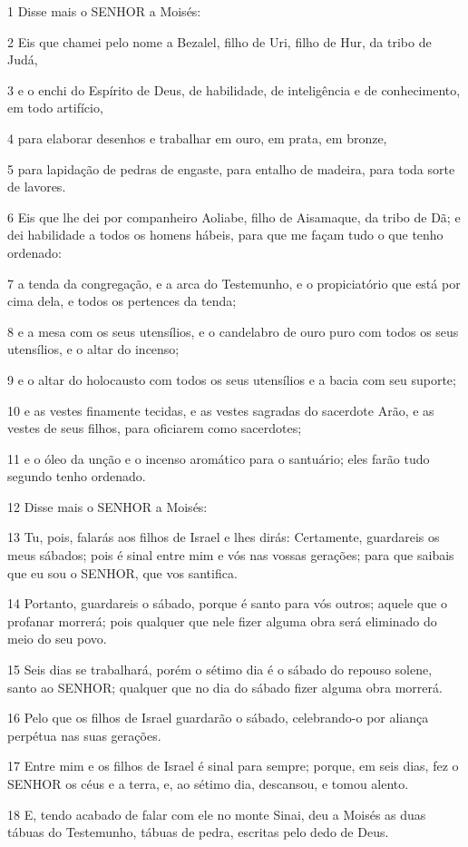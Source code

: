 \par 1 Disse mais o SENHOR a Moisés:
\par 2 Eis que chamei pelo nome a Bezalel, filho de Uri, filho de Hur, da tribo de Judá,
\par 3 e o enchi do Espírito de Deus, de habilidade, de inteligência e de conhecimento, em todo artifício,
\par 4 para elaborar desenhos e trabalhar em ouro, em prata, em bronze,
\par 5 para lapidação de pedras de engaste, para entalho de madeira, para toda sorte de lavores.
\par 6 Eis que lhe dei por companheiro Aoliabe, filho de Aisamaque, da tribo de Dã; e dei habilidade a todos os homens hábeis, para que me façam tudo o que tenho ordenado:
\par 7 a tenda da congregação, e a arca do Testemunho, e o propiciatório que está por cima dela, e todos os pertences da tenda;
\par 8 e a mesa com os seus utensílios, e o candelabro de ouro puro com todos os seus utensílios, e o altar do incenso;
\par 9 e o altar do holocausto com todos os seus utensílios e a bacia com seu suporte;
\par 10 e as vestes finamente tecidas, e as vestes sagradas do sacerdote Arão, e as vestes de seus filhos, para oficiarem como sacerdotes;
\par 11 e o óleo da unção e o incenso aromático para o santuário; eles farão tudo segundo tenho ordenado.
\par 12 Disse mais o SENHOR a Moisés:
\par 13 Tu, pois, falarás aos filhos de Israel e lhes dirás: Certamente, guardareis os meus sábados; pois é sinal entre mim e vós nas vossas gerações; para que saibais que eu sou o SENHOR, que vos santifica.
\par 14 Portanto, guardareis o sábado, porque é santo para vós outros; aquele que o profanar morrerá; pois qualquer que nele fizer alguma obra será eliminado do meio do seu povo.
\par 15 Seis dias se trabalhará, porém o sétimo dia é o sábado do repouso solene, santo ao SENHOR; qualquer que no dia do sábado fizer alguma obra morrerá.
\par 16 Pelo que os filhos de Israel guardarão o sábado, celebrando-o por aliança perpétua nas suas gerações.
\par 17 Entre mim e os filhos de Israel é sinal para sempre; porque, em seis dias, fez o SENHOR os céus e a terra, e, ao sétimo dia, descansou, e tomou alento.
\par 18 E, tendo acabado de falar com ele no monte Sinai, deu a Moisés as duas tábuas do Testemunho, tábuas de pedra, escritas pelo dedo de Deus.

